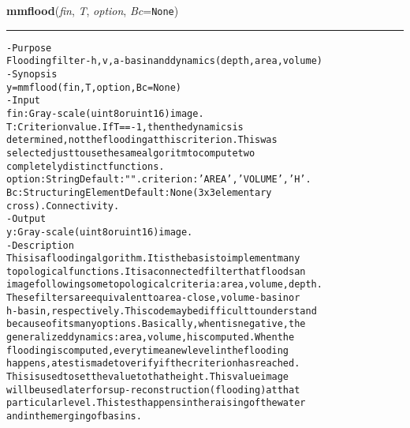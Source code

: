     \begin{boxedminipage}{\textwidth}

    \raggedright \textbf{mmflood}(\textit{fin}, \textit{T}, \textit{option}, \textit{Bc}=\texttt{N\-o\-n\-e\-})

    \vspace{-1.5ex}

    \rule{\textwidth}{0.5\fboxrule}
\begin{alltt}
- Purpose
    Flooding filter- h,v,a-basin and dynamics (depth, area, volume)
- Synopsis
    y = mmflood(fin, T, option, Bc=None)
- Input
    fin:    Gray-scale (uint8 or uint16) image.
    T:      Criterion value. If T==-1, then the dynamics is
            determined, not the flooding at this criterion. This was
            selected just to use the same algoritm to compute two
            completely distinct functions.
    option: String Default: "". criterion: 'AREA', 'VOLUME', 'H'.
    Bc:     Structuring Element Default: None (3x3 elementary
            cross). Connectivity.
- Output
    y: Gray-scale (uint8 or uint16) image.
- Description
    This is a flooding algorithm. It is the basis to implement many
    topological functions. It is a connected filter that floods an
    image following some topological criteria: area, volume, depth.
    These filters are equivalent to area-close, volume-basin or
    h-basin, respectively. This code may be difficult to understand
    because of its many options. Basically, when t is negative, the
    generalized dynamics: area, volume, h is computed. When the
    flooding is computed, every time a new level in the flooding
    happens, a test is made to verify if the criterion has reached.
    This is used to set the value to that height. This value image
    will be used later for sup-reconstruction (flooding) at that
    particular level. This test happens in the raising of the water
    and in the merging of basins.\end{alltt}

    \vspace{1ex}

    \end{boxedminipage}

    \label{multireg:num_pymorph:mmframe}
    \vspace{0.5ex}

